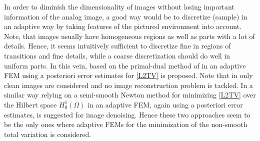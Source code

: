 \documentclass[enabledeprecatedfontcommands,cleardoublepage=empty,headsepline,twoside,11pt,DIV=15,BCOR=12mm,final]{scrartcl}
\begin{document}
In order to diminish the dimensionality of images without losing important information of the analog image, a good way would be to discretize (sample) in an adaptive way by taking features of the pictured environment into account. Note, that images usually have homogeneous regions as well as parts with a lot of details. Hence, it seems intuitively sufficient to discretize fine in regions of transitions and fine details, while a coarse discretization should do well in uniform parts. In this vein, based on the primal-dual method of \cite{ChambollePock:11} in \cite{Bartels:15a} an adaptive FEM using a posteriori error estimates for \eqref{L2TV} is proposed.  %
Note that in \cite{Bartels:15a} only clean images are considered and no image reconstruction problem is tackled. In a similar way relying on a semi-smooth Newton method for minimizing \eqref{L2TV} over the Hilbert space $H^1_0(\Omega)$ in \cite{HintermullerRincon-Camacho:14} an adaptive FEM, again using a posteriori error estimates, is suggested for image denoising. Hence these two approaches seem to be the only ones where adaptive FEMs for the minimization of the non-smooth total variation is considered. 
\end{document}
